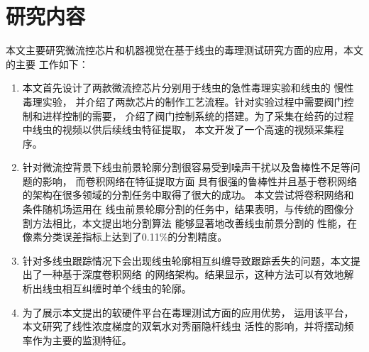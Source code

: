 \section{研究内容}
\label{sec:intro:org}
	本文主要研究微流控芯片和机器视觉在基于线虫的毒理测试研究方面的应用，本文的主要
	工作如下：
	\begin{enumerate}
	  \item 本文首先设计了两款微流控芯片分别用于线虫的急性毒理实验和线虫的
	  慢性毒理实验，
	  并介绍了两款芯片的制作工艺流程。针对实验过程中需要阀门控制和进样控制的需要，
	  介绍了阀门控制系统的搭建。为了采集在给药的过程中线虫的视频以供后续线虫特征提取，
	  本文开发了一个高速的视频采集程序。
	  \item 针对微流控背景下线虫前景轮廓分割很容易受到噪声干扰以及鲁棒性不足等问题的影响，
	  而卷积网络在特征提取方面
	  具有很强的鲁棒性并且基于卷积网络的架构在很多领域的分割任务中取得了很大的成功。
	  本文尝试将卷积网络和条件随机场运用在
	  线虫前景轮廓分割的任务中，结果表明，与传统的图像分割方法相比，本文提出地分割算法
	  能够显著地改善线虫前景分割的
	  性能，在像素分类误差指标上达到了0.11\%的分割精度。
	  \item 针对多线虫跟踪情况下会出现线虫轮廓相互纠缠导致跟踪丢失的问题，本文提出了一种基于深度卷积网络
	  的网络架构。结果显示，这种方法可以有效地解析出线虫相互纠缠时单个线虫的轮廓。
	  \item 为了展示本文提出的软硬件平台在毒理测试方面的应用优势，
	  运用该平台，本文研究了线性浓度梯度的双氧水对秀丽隐杆线虫
	  活性的影响，并将摆动频率作为主要的监测特征。
	\end{enumerate}
	
